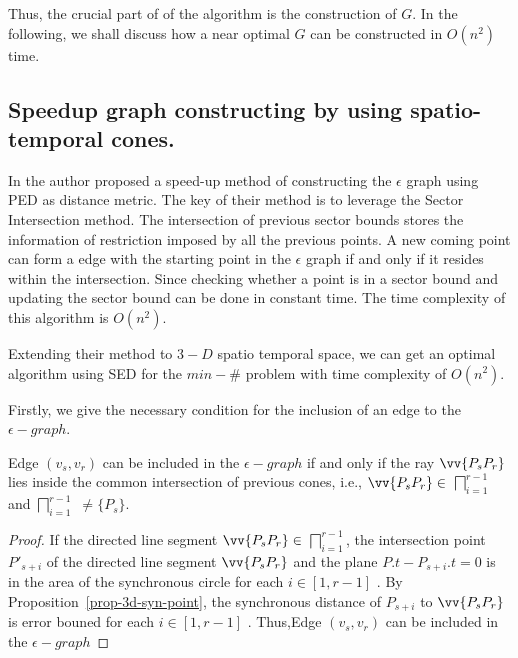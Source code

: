 Thus, the crucial part of of the algorithm is the construction of $G$. 
In the following, we shall discuss how a near optimal $G$ can be constructed in $O(n^2)$ time.


\subsection{Speedup graph constructing by using spatio-temporal cones.}
In \cite{Chan:Optimal} the author proposed a speed-up method of constructing the
$\epsilon$ graph using PED as distance metric.
The key of their method is to leverage the Sector Intersection method.
The intersection of previous sector bounds stores the information of restriction
imposed by all the previous points. 
A new coming point can form a edge with the starting point in the $\epsilon$
graph if and only if it resides within the intersection.
Since checking whether a point is in a sector bound and updating the sector bound can be done in
constant time. The time complexity of this algorithm is $O(n^2)$.

Extending their method to $3-D$ spatio temporal space, we can get an optimal
algorithm using SED for the $min-\#$ problem with time complexity of $O(n^2)$.


Firstly, we give the necessary condition for the inclusion of an edge to the $\epsilon - graph$.

\begin{prop}
\label{prop-edge-check}
Edge $(v_s,v_r)$ can be included in the $\epsilon - graph$ if and only if the ray
$\vv{P_sP_r}$ lies inside the common intersection of previous cones, i.e.,
$\vv{P_sP_r} \in $ $\bigsqcap_{i=1}^{r - 1}$  and
$\bigsqcap_{i=1}^{r - 1}$ $\ne \{P_s\}$. 
\end{prop}

\begin{proof}
If the directed line segment $\vv{P_sP_r} \in$ $\bigsqcap_{i=1}^{r-1}$, the
intersection point $P'_{s+i}$ of the directed line segment $\vv{P_sP_r}$ and the
plane $P.t - P_{s+i}.t = 0$  is  in the area of the  synchronous circle
 for each $i \in [1,r - 1]$ . By Proposition~\ref{prop-3d-syn-point}, the
synchronous distance of $P_{s+i}$ to $\vv{P_sP_r}$ is error bouned for each $i \in [1,r - 1]$ . Thus,Edge
$(v_s,v_r)$ can be included in the $\epsilon - graph$  
\end{proof}


